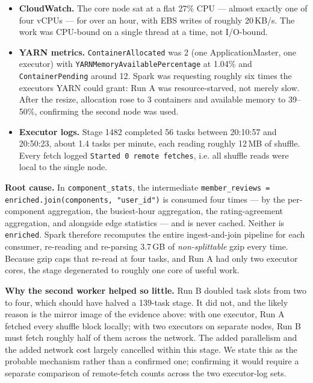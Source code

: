 \documentclass[12pt]{article}
\begin{document}
\begin{itemize}
  \item \textbf{CloudWatch.} The core node sat at a flat 27\% CPU --- almost
        exactly one of four vCPUs --- for over an hour, with EBS writes of
        roughly 20\,KB/s. The work was CPU-bound on a single thread at a time,
        not I/O-bound.
  \item \textbf{YARN metrics.} \texttt{ContainerAllocated} was 2 (one
        ApplicationMaster, one executor) with
        \texttt{YARNMemoryAvailablePercentage} at 1.04\% and
        \texttt{ContainerPending} around 12. Spark was requesting roughly six
        times the executors YARN could grant: Run A was resource-starved, not
        merely slow. After the resize, allocation rose to 3 containers and
        available memory to 39--50\%, confirming the second node was used.
  \item \textbf{Executor logs.} Stage 1482 completed 56 tasks between
        20:10:57 and 20:50:23, about 1.4 tasks per minute, each reading
        roughly 12\,MB of shuffle. Every fetch logged
        \texttt{Started 0 remote fetches}, i.e. all shuffle reads were local
        to the single node.
\end{itemize}

\textbf{Root cause.} In \texttt{component\_stats}, the intermediate
\texttt{member\_reviews = enriched.join(components, "user\_id")} is consumed
four times --- by the per-component aggregation, the busiest-hour
aggregation, the rating-agreement aggregation, and alongside edge statistics
--- and is never cached. Neither is \texttt{enriched}. Spark therefore
recomputes the entire ingest-and-join pipeline for each consumer, re-reading
and re-parsing 3.7\,GB of \emph{non-splittable} gzip every time. Because gzip
caps that re-read at four tasks, and Run A had only two executor cores, the
stage degenerated to roughly one core of useful work.

\textbf{Why the second worker helped so little.} Run B doubled task slots
from two to four, which should have halved a 139-task stage. It did not,
and the likely reason is the mirror image of the evidence above: with one
executor, Run A fetched every shuffle block locally; with two executors on
separate nodes, Run B must fetch roughly half of them across the network.
The added parallelism and the added network cost largely cancelled within
this stage. We state this as the probable mechanism rather than a confirmed
one; confirming it would require a separate comparison of remote-fetch counts
across the two executor-log sets.
\end{document}
